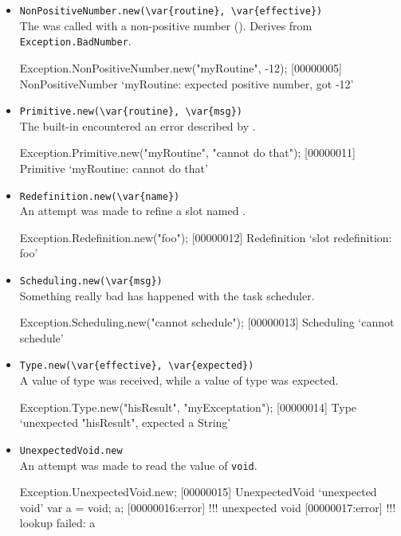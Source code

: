 \begin{itemize}
\item \lstinline|NonPositiveNumber.new(\var{routine}, \var{effective})|\\
  The  was called with a non-positive number
  ().  Derives from \lstinline|Exception.BadNumber|.
\begin{urbiscript}
Exception.NonPositiveNumber.new("myRoutine", -12);
[00000005] NonPositiveNumber `myRoutine: expected positive number, got -12'
\end{urbiscript}

\item \lstinline|Primitive.new(\var{routine}, \var{msg})|\\
  The built-in  encountered an error described by
  .
\begin{urbiscript}
Exception.Primitive.new("myRoutine", "cannot do that");
[00000011] Primitive `myRoutine: cannot do that'
\end{urbiscript}

\item \lstinline|Redefinition.new(\var{name})|\\
  An attempt was made to refine a slot named .
\begin{urbiscript}
Exception.Redefinition.new("foo");
[00000012] Redefinition `slot redefinition: foo'
\end{urbiscript}

\item \lstinline|Scheduling.new(\var{msg})|\\
  Something really bad has happened with the \urbi task scheduler.
\begin{urbiscript}
Exception.Scheduling.new("cannot schedule");
[00000013] Scheduling `cannot schedule'
\end{urbiscript}

\item \lstinline|Type.new(\var{effective}, \var{expected})|\\
  A value of type  was received, while a value of type
   was expected.
\begin{urbiscript}
Exception.Type.new("hisResult", "myExceptation");
[00000014] Type `unexpected "hisResult", expected a String'
\end{urbiscript}

\item \lstinline|UnexpectedVoid.new|\\
  An attempt was made to read the value of \lstinline|void|.
\begin{urbiscript}
Exception.UnexpectedVoid.new;
[00000015] UnexpectedVoid `unexpected void'
var a = void;
a;
[00000016:error] !!! unexpected void
[00000017:error] !!! lookup failed: a
\end{urbiscript}

\end{itemize}


